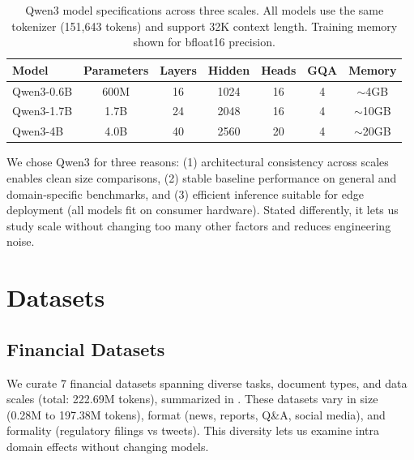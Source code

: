 \begin{table}[h]
\centering
\caption[Qwen3 Model Specifications]{Qwen3 model specifications across three scales. All models use the same tokenizer (151,643 tokens) and support 32K context length. Training memory shown for bfloat16 precision.}
\label{tab:model_specs}
\begin{tabular}{lcccccc}
\toprule
\textbf{Model} & \textbf{Parameters} & \textbf{Layers} & \textbf{Hidden} & \textbf{Heads} & \textbf{GQA} & \textbf{Memory} \\
\midrule
Qwen3-0.6B & 600M & 16 & 1024 & 16 & 4 & $\sim$4GB \\
Qwen3-1.7B & 1.7B & 24 & 2048 & 16 & 4 & $\sim$10GB \\
Qwen3-4B & 4.0B & 40 & 2560 & 20 & 4 & $\sim$20GB \\
\bottomrule
\end{tabular}
\end{table}

We chose Qwen3 for three reasons: (1) architectural consistency across scales enables clean size comparisons, (2) stable baseline performance on general and domain‑specific benchmarks, and (3) efficient inference suitable for edge deployment (all models fit on consumer hardware). Stated differently, it lets us study scale without changing too many other factors and reduces engineering noise.

\section{Datasets}

\subsection{Financial Datasets}

We curate 7 financial datasets spanning diverse tasks, document types, and data scales (total: 222.69M tokens), summarized in . These datasets vary in size (0.28M to 197.38M tokens), format (news, reports, Q\&A, social media), and formality (regulatory filings vs tweets). This diversity lets us examine intra domain effects without changing models.

